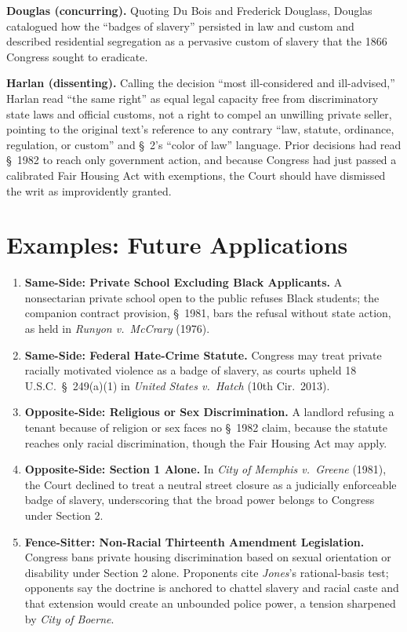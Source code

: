 \documentclass[12pt]{article}
\begin{document}
\textbf{Douglas (concurring).} Quoting Du Bois and Frederick Douglass, Douglas catalogued how the ``badges of slavery'' persisted in law and custom and described residential segregation as a pervasive custom of slavery that the 1866 Congress sought to eradicate.

\textbf{Harlan (dissenting).} Calling the decision ``most ill-considered and ill-advised,'' Harlan read ``the same right'' as equal legal capacity free from discriminatory state laws and official customs, not a right to compel an unwilling private seller, pointing to the original text's reference to any contrary ``law, statute, ordinance, regulation, or custom'' and \S\ 2's ``color of law'' language. Prior decisions had read \S\ 1982 to reach only government action, and because Congress had just passed a calibrated Fair Housing Act with exemptions, the Court should have dismissed the writ as improvidently granted.

\section{Examples: Future Applications}

\begin{enumerate}
\item \textbf{Same-Side: Private School Excluding Black Applicants.} A nonsectarian private school open to the public refuses Black students; the companion contract provision, \S\ 1981, bars the refusal without state action, as held in \textit{Runyon v.\ McCrary} (1976).
\item \textbf{Same-Side: Federal Hate-Crime Statute.} Congress may treat private racially motivated violence as a badge of slavery, as courts upheld 18 U.S.C.\ \S\ 249(a)(1) in \textit{United States v.\ Hatch} (10th Cir.\ 2013).
\item \textbf{Opposite-Side: Religious or Sex Discrimination.} A landlord refusing a tenant because of religion or sex faces no \S\ 1982 claim, because the statute reaches only racial discrimination, though the Fair Housing Act may apply.
\item \textbf{Opposite-Side: Section 1 Alone.} In \textit{City of Memphis v.\ Greene} (1981), the Court declined to treat a neutral street closure as a judicially enforceable badge of slavery, underscoring that the broad power belongs to Congress under Section 2.
\item \textbf{Fence-Sitter: Non-Racial Thirteenth Amendment Legislation.} Congress bans private housing discrimination based on sexual orientation or disability under Section 2 alone. Proponents cite \textit{Jones}'s rational-basis test; opponents say the doctrine is anchored to chattel slavery and racial caste and that extension would create an unbounded police power, a tension sharpened by \textit{City of Boerne}.
\end{enumerate}
\end{document}
